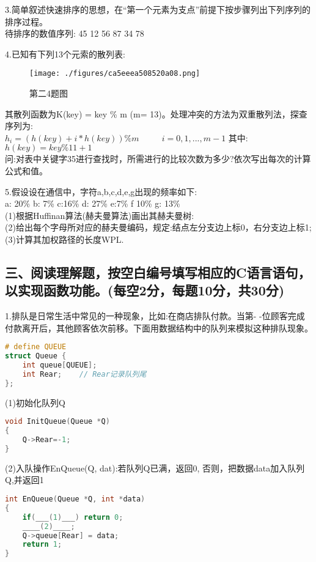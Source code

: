 3.简单叙述快速排序的思想，在“第一个元素为支点”前提下按步骤列出下列序列的排序过程。 \\
待排序的数值序列: 45 12 56 87 34 78

4.已知有下列13个元索的散列表:
\begin{figure}[ht]
\centering
\texttt{[image: ./figures/ca5eeea508520a08.png]}
\caption{第二4题图} \label{fig_SYDS12_3}
\end{figure}
其散列函数为K(key) = key \% m (m= 13)。处理冲突的方法为双重散列法，探查序列为:  \\
$h_i=(h(key)+i*h(key))\%m$ $\qquad$ $i=0,1,...,m-1$  其中: $h(key)=key\%11+1$ \\
问:对表中关键字35进行查找时，所需进行的比较次数为多少?依次写出每次的计算公式和值。

5.假设设在通信中，字符a,b,c,d,e,g出现的频率如下: \\
a: 20\% b: 7\% c:16\% d: 27\% e:7\% f 10\% g: 13\% \\
(1)根据Huffinan算法(赫夫曼算法)画出其赫夫曼树: \\
(2)给出每个字母所对应的赫夫曼编码，规定:结点左分支边上标0，右分支边上标1; \\
(3)计算其加权路径的长度WPL.

\subsection{三、阅读理解题，按空白编号填写相应的C语言语句，以实现函数功能。(每空2分，每题10分，共30分)}

1.排队是日常生活中常见的一种现象，比如:在商店排队付款。当第- -位顾客完成付款离开后，其他顾客依次前移。下面用数据结构中的队列来模拟这种排队现象。 \\
\begin{lstlisting}[language=cpp]
# define QUEUE
struct Queue {
    int queue[QUEUE];
    int Rear;    // Rear记录队列尾
};
\end{lstlisting}
(1)初始化队列Q
\begin{lstlisting}[language=cpp]
void InitQueue(Queue *Q)
{
    Q->Rear=-1;
}
\end{lstlisting}

(2)入队操作EnQueue(Q, dat):若队列Q已满，返回0, 否则，把数据data加入队列Q,并返回1
\begin{lstlisting}[language=cpp]
int EnQueue(Queue *Q, int *data)
{
    if(___(1)___) return 0;
    ____(2)____;
    Q->queue[Rear] = data;
    return 1;
}
\end{lstlisting}

